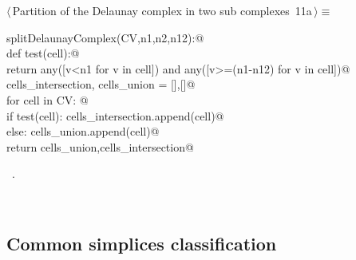 \documentclass[11pt,oneside]{article}	%
\begin{document}
\begin{flushleft} \small
\begin{minipage}{\linewidth} \label{scrap15}
\protect{}$\langle\,$Partition of the Delaunay complex in two sub complexes\nobreak\ {\footnotesize 11a}$\,\rangle\equiv$
\vspace{-1ex}
\begin{list}{}{} \item
\mbox{}\verb@def splitDelaunayComplex(CV,n1,n2,n12):@\\
\mbox{}\verb@   def test(cell):@\\
\mbox{}\verb@      return any([v<n1 for v in cell]) and any([v>=(n1-n12) for v in cell])@\\
\mbox{}\verb@   cells_intersection, cells_union = [],[]@\\
\mbox{}\verb@   for cell in CV: @\\
\mbox{}\verb@      if test(cell): cells_intersection.append(cell)@\\
\mbox{}\verb@      else: cells_union.append(cell)@\\
\mbox{}\verb@   return cells_union,cells_intersection@\\
\mbox{}\verb@@{\NWsep}
\end{list}
\vspace{-1ex}
\footnotesize\addtolength{\baselineskip}{-1ex}
\begin{list}{}{\setlength{\itemsep}{-\parsep}\setlength{\itemindent}{-\leftmargin}}
\item \NWtxtMacroRefIn\ .
\end{list}
\end{minipage}\\[4ex]
\end{flushleft}




\subsection{Common simplices classification}
\end{document}
